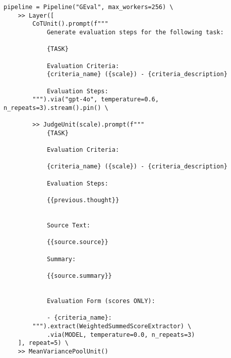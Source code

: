 
\lstset{language=Python, 
        basicstyle=\ttfamily\small, 
        breaklines=true, 
        numbers=left, 
        numberstyle=\tiny, 
        stepnumber=1}

\begin{lstlisting}
pipeline = Pipeline("GEval", max_workers=256) \
    >> Layer([
        CoTUnit().prompt(f"""
            Generate evaluation steps for the following task:

            {TASK}

            Evaluation Criteria:
            {criteria_name} ({scale}) - {criteria_description}

            Evaluation Steps:
        """).via("gpt-4o", temperature=0.6, n_repeats=3).stream().pin() \

        >> JudgeUnit(scale).prompt(f"""
            {TASK}

            Evaluation Criteria:

            {criteria_name} ({scale}) - {criteria_description}

            Evaluation Steps:

            {{previous.thought}}


            Source Text:

            {{source.source}}

            Summary:

            {{source.summary}}


            Evaluation Form (scores ONLY):

            - {criteria_name}:
        """).extract(WeightedSummedScoreExtractor) \
            .via(MODEL, temperature=0.0, n_repeats=3)
    ], repeat=5) \
    >> MeanVariancePoolUnit()
\end{lstlisting}
